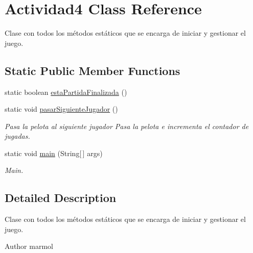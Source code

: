 \hypertarget{classActividad4}{\section{Actividad4 Class Reference}
\label{classActividad4}
}


Clase con todos los métodos estáticos que se encarga de iniciar y gestionar el juego.  


\subsection*{Static Public Member Functions}
\begin{DoxyCompactItemize}
\item 
static boolean \hyperlink{classActividad4_a646ea569d68870fe882316f81f57662b}{esta\-Partida\-Finalizada} ()
\item 
static void \hyperlink{classActividad4_a23cf00e913eac32dea7597b617728047}{pasar\-Siguiente\-Jugador} ()
\begin{DoxyCompactList}\small\item\em Pasa la pelota al siguiente jugador Pasa la pelota e incrementa el contador de jugadas. \end{DoxyCompactList}\item 
static void \hyperlink{classActividad4_a58b3e39e7248184ce102cf9c41cf393a}{main} (String\mbox{[}$\,$\mbox{]} args)
\begin{DoxyCompactList}\small\item\em Main. \end{DoxyCompactList}\end{DoxyCompactItemize}


\subsection{Detailed Description}
Clase con todos los métodos estáticos que se encarga de iniciar y gestionar el juego. 

\begin{DoxyAuthor}{Author}
marmol 
\end{DoxyAuthor}


